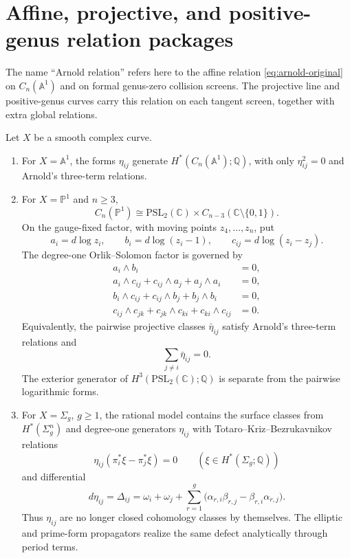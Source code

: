 \section{Affine, projective, and positive-genus relation packages}
\label{sec:arnold-genus-split-appendix}

The name ``Arnold relation'' refers here to the affine relation
\eqref{eq:arnold-original} on $C_n(\mathbb{A}^1)$ and on formal
genus-zero collision screens. The projective line and positive-genus
curves carry this relation on each tangent screen, together with extra
global relations.

\begin{proposition}
\label{prop:arnold-genus-split-appendix}
Let $X$ be a smooth complex curve.
\begin{enumerate}[label=\textup{(\roman*)}]
\item For $X=\mathbb{A}^1$, the forms $\eta_{ij}$ generate
$H^*(C_n(\mathbb{A}^1);\mathbb{Q})$, with only
$\eta_{ij}^2=0$ and Arnold's three-term relations.

\item For $X=\mathbb{P}^1$ and $n\geq3$,
\[
C_n(\mathbb{P}^1)
\cong
\mathrm{PSL}_2(\mathbb{C})\times
C_{n-3}(\mathbb{C}\setminus\{0,1\}).
\]
On the gauge-fixed factor, with moving points $z_4,\ldots,z_n$, put
\[
a_i=d\log z_i,\qquad
b_i=d\log(z_i-1),\qquad
c_{ij}=d\log(z_i-z_j).
\]
The degree-one Orlik--Solomon factor is governed by
\begin{align}
a_i\wedge b_i &=0,\label{eq:arnold-app-p1-rel-1}\\
a_i\wedge c_{ij}+c_{ij}\wedge a_j+a_j\wedge a_i&=0,\label{eq:arnold-app-p1-rel-2}\\
b_i\wedge c_{ij}+c_{ij}\wedge b_j+b_j\wedge b_i&=0,\label{eq:arnold-app-p1-rel-3}\\
c_{ij}\wedge c_{jk}+c_{jk}\wedge c_{ki}+c_{ki}\wedge c_{ij}&=0.\label{eq:arnold-app-p1-rel-4}
\end{align}
Equivalently, the pairwise projective classes
$\bar\eta_{ij}$ satisfy Arnold's three-term relations and
\[
\sum_{j\neq i}\bar\eta_{ij}=0.
\]
The exterior generator of $H^3(\mathrm{PSL}_2(\mathbb{C});\mathbb{Q})$
is separate from the pairwise logarithmic forms.

\item For $X=\Sigma_g$, $g\geq1$, the rational model contains the
surface classes from $H^*(\Sigma_g^n)$ and degree-one generators
\(\eta_{ij}\) with Totaro--Kriz--Bezrukavnikov relations
\[
\eta_{ij}(\pi_i^*\xi-\pi_j^*\xi)=0
\qquad
(\xi\in H^*(\Sigma_g;\mathbb{Q}))
\]
and differential
\begin{equation}\label{eq:arnold-app-totaro-differential}
d\eta_{ij}
=
\Delta_{ij}
=
\omega_i+\omega_j+
\sum_{r=1}^g
\bigl(\alpha_{r,i}\beta_{r,j}-\beta_{r,i}\alpha_{r,j}\bigr).
\end{equation}
Thus $\eta_{ij}$ are no longer closed cohomology classes by
themselves. The elliptic and prime-form propagators realize the same
defect analytically through period terms.
\end{enumerate}
\end{proposition}

